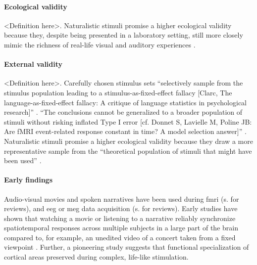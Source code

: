 \paragraph{Ecological validity}
<Definition here>.
Naturalistic stimuli promise a higher ecological validity \citep{zaki2009need,
hasson2012future, hamilton2018revolution} because they, despite being presented
in a laboratory setting, still more closely mimic the richness of real-life
visual and auditory experiences \citep{hasson2008neurocinematics,
haxby2020naturalistic}.

\paragraph{External validity}
<Definition here>.
Carefully chosen stimulus sets ``selectively sample from the stimulus population
leading to a stimulus-as-fixed-effect fallacy [Clarc, The
language-as-fixed-effect fallacy: A critique of language statistics in
psychological research]'' \citep{westfall2016fixing}.
%
``The conclusions cannot be generalized to a broader population of stimuli
without risking inflated Type I error  [cf. Donnet S, Lavielle M, Poline JB: Are
fMRI event-related response constant in time? A model selection
answer]'' \citep{westfall2016fixing}.
%
Naturalistic stimuli promise a higher ecological validity because they draw a
more representative sample from the ``theoretical population of stimuli that
might have been used'' \citep{westfall2016fixing}.


\paragraph{Early findings}
Audio-visual movies and spoken narratives have been used during \ac{fmri}
(s.\citet{hamilton2018revolution, hasson2008neurocinematics,
jaaskelainen2021movies, sonkusare2019naturalistic, saarimaki2021naturalistic}
for reviews), and \ac{eeg} or \ac{meg} data acquisition (s. \citet{alday2019meg,
kandylaki2019story} for reviews).
%
Early studies have shown that watching a movie \citep{hasson2004intersubject,
hasson2008neurocinematics, hasson2010reliability} or listening to a
narrative \citep{lerner2011topographic, wilson2008beyond} reliably synchronize spatiotemporal responses across multiple subjects
in a large part of the brain compared to, for example, an unedited video of a
concert taken from a fixed viewpoint \citep{hasson2004intersubject,
hasson2008neurocinematics, hasson2010reliability, lerner2011topographic,
wilson2008beyond}.
%
Further, a pioneering study \citep{bartels2004mapping} suggests that functional
specialization of cortical areas preserved during complex, life-like
stimulation.


